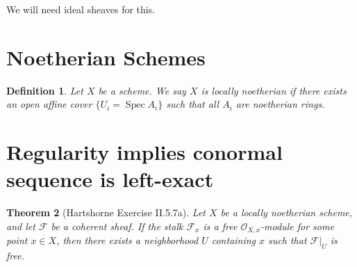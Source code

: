 \documentclass[a4paper]{article}
\newtheorem{thm}{Theorem}[section]
\newtheorem{defn}[thm]{Definition}
\newcommand{\Spec}{\operatorname{Spec}}
\begin{document}
We will need ideal sheaves for this.

\section{Noetherian Schemes}

\begin{defn}
	Let \(X\) be a scheme. 
	We say \(X\) is \textit{locally noetherian}
	if there exists an open affine cover
	\(\{U_{i} = \Spec A_{i}\}\) such that
	all \(A_{i}\) are noetherian rings.
\end{defn}




\section{Regularity implies conormal sequence is left-exact}

\begin{thm}
	[Hartshorne Exercise II.5.7a]
	Let \(X\) be a locally noetherian scheme, and let
	\(\mathcal{F}\) be a coherent sheaf. 
	If the stalk \(\mathcal{F}_{x}\) is a free
	\(\mathcal{O}_{X,x} \)-module for some point
	\(x \in X\), then there exists
	a neighborhood \(U\) containing \(x\) such that
	\(\mathcal{F}|_{U}\) is free.
\end{thm}
\end{document}
